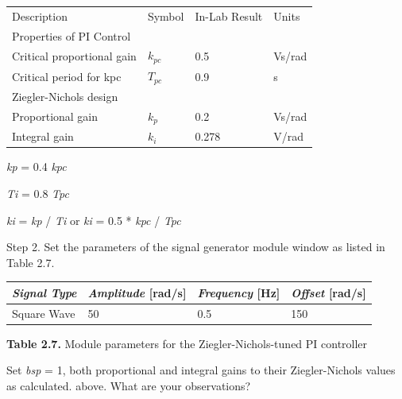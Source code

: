 \documentclass[]{article}
\begin{document}
\begin{table}
	\centering
	\begin{tabular}{llll}
		Description                & Symbol & In-Lab Result & Units  \\
		Properties of PI Control   &        &               &        \\
		Critical proportional gain & $k_{pc}$    & 0.5           & Vs/rad \\
		Critical period for kpc    & $T_{pc}$    & 0.9           & s      \\
		Ziegler-Nichols design     &        &               &        \\
		Proportional gain          & $k_p$     & 0.2           & Vs/rad \\
		Integral gain              & $k_i$    & 0.278         & V/rad  \\
	\end{tabular}
\end{table}

\emph{kp} = 0.4 \emph{kpc}

\emph{Ti} = 0.8 \emph{Tpc}

\emph{ki} = \emph{kp} / \emph{Ti} or \emph{ki} = 0.5 * \emph{kpc} /
\emph{Tpc}

Step 2. Set the parameters of the signal generator module window as
listed in Table 2.7.

\begin{longtable}[]{@{}llll@{}}
\toprule
\emph{\textbf{Signal Type}} & \textbf{\emph{Amplitude} {[}rad/s{]}} &
\textbf{\emph{Frequency} {[}Hz{]}} & \textbf{\emph{Offset}
{[}rad/s{]}}\tabularnewline
\midrule
\endhead
Square Wave & 50 & 0.5 & 150\tabularnewline
\bottomrule
\end{longtable}

\textbf{Table 2.7.} Module parameters for the Ziegler-Nichols-tuned PI
controller

Set \emph{bsp} = 1, both proportional and integral gains to their
Ziegler-Nichols values as calculated. above. What are your observations?
\end{document}
